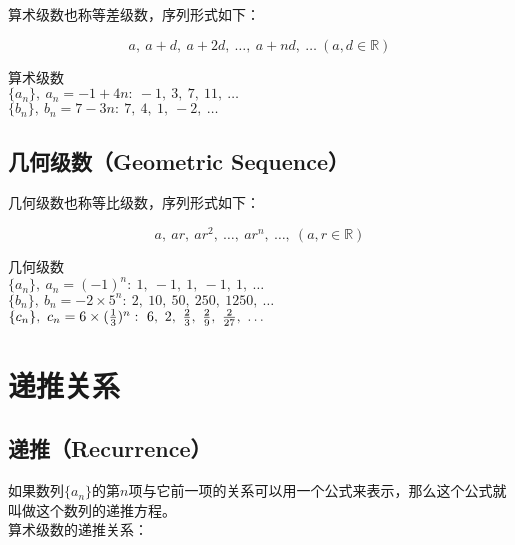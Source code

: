 算术级数也称等差级数，序列形式如下：

\vspace{-0.5cm}

$$
	a,\ a + d,\ a + 2d,\ \dots,\ a + nd,\ \dots\ (a, d \in \mathbb{R})
$$

\begin{tcolorbox}
	算术级数\\
	$ \{a_n\},\ a_n = -1 + 4n:\ -1,\ 3,\ 7,\ 11,\ \dots $\\
	$ \{b_n\},\ b_n = 7 - 3n:\ 7,\ 4,\ 1,\ -2,\ \dots $
\end{tcolorbox}

\vspace{0.5cm}

\subsection{几何级数（Geometric Sequence）}

几何级数也称等比级数，序列形式如下：

\vspace{-0.5cm}

$$
	a,\ ar,\ ar^2,\ \dots,\ ar^n,\ \dots,\ (a, r \in \mathbb{R})
$$

\begin{tcolorbox}
	几何级数\\
	$ \{a_n\},\ a_n = (-1)^n:\ 1,\ -1,\ 1,\ -1,\ 1,\ \dots $\\
	$ \{b_n\},\ b_n = -2 \times 5^n:\ 2,\ 10,\ 50,\ 250,\ 1250,\ \dots $\\
	$ \{c_n\},\ c_n = 6 \times ({1 \over 3})^n:\ 6,\ 2,\ {2 \over 3},\ {2 \over 9},\ {2 \over 27},\ \dots $
\end{tcolorbox}

\newpage

\section{递推关系}

\subsection{递推（Recurrence）}

如果数列$ \{a_n\} $的第$ n $项与它前一项的关系可以用一个公式来表示，那么这个公式就叫做这个数列的递推方程。\\

算术级数的递推关系：

\vspace{-1.5cm}


